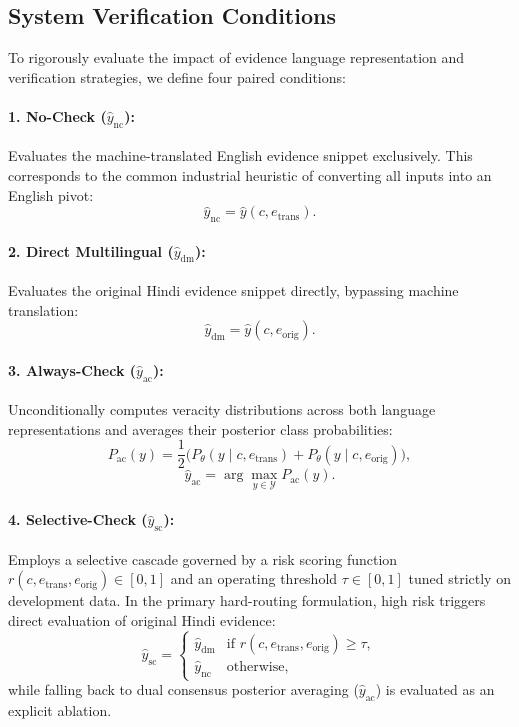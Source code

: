 \subsection{System Verification Conditions}
To rigorously evaluate the impact of evidence language representation and verification strategies, we define four paired conditions:

\paragraph{1. No-Check ($\hat{y}_{\text{nc}}$):}
Evaluates the machine-translated English evidence snippet exclusively. This corresponds to the common industrial heuristic of converting all inputs into an English pivot:
\begin{equation}
    \hat{y}_{\text{nc}} = \hat{y}(c, e_{\text{trans}}).
\end{equation}

\paragraph{2. Direct Multilingual ($\hat{y}_{\text{dm}}$):}
Evaluates the original Hindi evidence snippet directly, bypassing machine translation:
\begin{equation}
    \hat{y}_{\text{dm}} = \hat{y}(c, e_{\text{orig}}).
\end{equation}

\paragraph{3. Always-Check ($\hat{y}_{\text{ac}}$):}
Unconditionally computes veracity distributions across both language representations and averages their posterior class probabilities:
\begin{equation}
    P_{\text{ac}}(y) = \frac{1}{2}\Big(P_\theta(y \mid c, e_{\text{trans}}) + P_\theta(y \mid c, e_{\text{orig}})\Big),
\end{equation}
\begin{equation}
    \hat{y}_{\text{ac}} = \arg\max_{y \in \mathcal{Y}} P_{\text{ac}}(y).
\end{equation}

\paragraph{4. Selective-Check ($\hat{y}_{\text{sc}}$):}
Employs a selective cascade governed by a risk scoring function $r(c, e_{\text{trans}}, e_{\text{orig}}) \in [0, 1]$ and an operating threshold $\tau \in [0, 1]$ tuned strictly on development data. In the primary hard-routing formulation, high risk triggers direct evaluation of original Hindi evidence:
\begin{equation}
    \hat{y}_{\text{sc}} = \begin{cases}
        \hat{y}_{\text{dm}} & \text{if } r(c, e_{\text{trans}}, e_{\text{orig}}) \ge \tau, \\
        \hat{y}_{\text{nc}} & \text{otherwise},
    \end{cases}
\end{equation}
while falling back to dual consensus posterior averaging ($\hat{y}_{\text{ac}}$) is evaluated as an explicit ablation.

